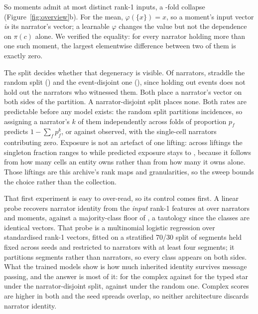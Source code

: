 \documentclass[conference]{IEEEtran}
\begin{document}
So \obsCells{} moments admit at most \obsDistinct{} distinct rank-1 inputs, a
\obsCollapse{}-fold collapse (Figure~\ref{fig:overview}b). For the mean, $\varphi(\{x\}) = x$, so a moment's input vector
\emph{is} its narrator's vector; a learnable $\varphi$ changes the value but not the
dependence on $\pi(c)$ alone. We verified the equality: for every narrator holding more than
one such moment, the largest elementwise difference between two of them is exactly zero.

The split decides whether that degeneracy is visible. Of \straddleTotal{} narrators,
\straddleRandomN{} straddle the random split (\straddleRandom{}) and \straddleEventN{} the
event-disjoint one (\straddleEvent{}), since holding out events does not hold out the
narrators who witnessed them. Both place a narrator's vector on both sides of the partition.
A narrator-disjoint split places none. Both rates are predictable before any model exists:
the random split partitions incidences, so assigning a narrator's $k$ of them independently
across folds of proportion $p_f$ predicts
$1 - \sum_f p_f^{k}$, or \exposurePredicted{} against \straddleRandom{} observed, with the
\exposureSingletonN{} single-cell narrators contributing zero. Exposure is not an artefact of
one lifting: across \liftConfigs{} liftings the singleton fraction ranges
\liftSingLo{} to \liftSingHi{} while predicted exposure stays \liftExpLo{} to \liftExpHi{},
because it follows from how many cells an entity owns rather than from how many it owns
alone. Those liftings are this archive's rank maps and granularities, so the sweep bounds the
choice rather than the collection.

That first experiment is easy to over-read, so its control comes first. A linear probe
recovers narrator identity from the \emph{input} rank-1 features at
\probeInputControl{} over \probeClasses{} narrators and \probeN{} moments, against a
majority-class floor of \probeChance{}, a tautology since the classes are identical vectors.
That probe is a multinomial logistic regression over standardised rank-1 vectors, fitted on a
stratified 70/30 split of segments held fixed across seeds and restricted to narrators with at
least four segments; it partitions segments rather than narrators, so every class appears on
both sides.
What the trained models show is how much inherited identity survives
message passing, and the answer is most of it: \probeNarrFive{} for the complex against
\probeNarrThree{} for the typed star under the narrator-disjoint split, \probeRandFive{}
against \probeRandThree{} under the random one. Complex scores are higher in both and the
seed spreads overlap, so neither architecture discards narrator identity.
\end{document}
